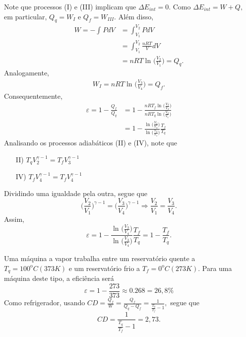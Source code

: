 \documentclass[phsyicsII_notes.tex]{subfiles}
\begin{document}
Note que processos (I) e (III) implicam que \(\Delta E_{int} = 0.\) Como \(\Delta E_{int} = W + Q,\) em particular,
\(Q_{q} = W_{I}\) e \(Q_{f} = W_{III}.\) Além disso,
\begin{align*}
	W = - \int_{}^{}PdV & = \int_{V_{1}}^{V_{2}}PdV                                \\
	                    & = \int_{V_{1}}^{V_{2}}\frac{nRT}{V}dV                    \\
	                    & = nRT \ln^{}{\biggl(\frac{V_{2}}{V_{1}}\biggr)} = Q_{q}.
\end{align*}
Analogamente,
\begin{align*}
	W_{I} = nRT\ln^{}{\biggl(\frac{V_{3}}{V_{4}}\biggr)} = Q_{f}.
\end{align*}
Consequentemente,
\begin{align*}
	\varepsilon = 1 - \frac{Q_{f}}{Q_{q}} & = 1 - \frac{nRT_{f}\ln^{}{\biggl(\frac{V_{3}}{V_{4}}\biggr)}}{nRT_{q}\ln^{}{\biggl(\frac{V_{2}}{V_{1}}\biggr)}}      \\
	                                      & = 1 - \frac{\ln^{}{\biggl(\frac{V_{3}}{V_{4}}\biggr)}}{\ln^{}{\biggl(\frac{V_{2}}{V_{1}}\biggr)}}\frac{T_{f}}{T_{q}}
\end{align*}
Analisando os processos adiabáticos (II) e (IV), note que
\begin{itemize}
	\item[II)] \(T_{q}V_{2}^{\gamma -1} = T_{f}V_{3}^{\gamma -1}\)
	\item[IV)] \(T_{f}V_{4}^{\gamma -1} = T_{f}V_{4}^{\gamma -1}\)
\end{itemize}
Dividindo uma igualdade pela outra, segue que
\[
	\biggl(\frac{V_{2}}{V_{1}}\biggr)^{\gamma -1} = \biggl(\frac{V_{3}}{V_{4}}\biggr)^{\gamma -1} \Rightarrow \frac{V_{2}}{V_{1}} = \frac{V_{3}}{V_{4}}.
\]
Assim,
\[
	\varepsilon  = 1 - \frac{\ln^{}{\biggl(\frac{V_{3}}{V_{4}}\biggr)}}{\ln^{}{\biggl(\frac{V_{3}}{V_{4}}\biggr)}}\frac{T_{f}}{T_{q}} = 1 - \frac{T_{f}}{T_{q}}.
\]
\begin{example}
	Uma máquina a vapor trabalha entre um reservatório quente a \(T_{q}={100}^{\mathrm{o}}C (373K)\) e um
	reservatório frio a \(T_{f}={0}^{\mathrm{o}}C (273K).\) Para uma máquina deste tipo, a eficiência será
	\[
		\varepsilon  = 1 - \frac{273}{373}\approx 0.268 = 26,8\%
	\]
	Como refrigerador, usando \(CD = \frac{Q_{f}}{W} = \frac{Q_{f}}{Q_{q}-Q_{f}} = \frac{1}{\frac{T_{q}}{T_{f}}-1},\) segue que
	\[
		CD = \frac{1}{\frac{T_{q}}{T_{f}}-1} = 2,73.
	\]
\end{example}
\end{document}
